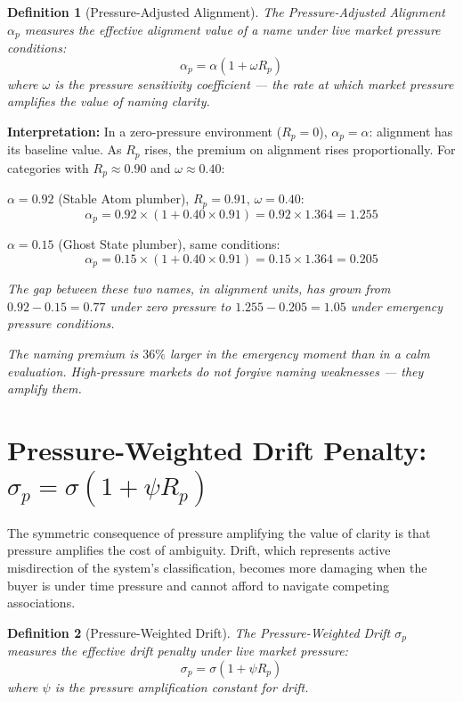 \documentclass[12pt, openany]{book}
\theoremstyle{thmstyle}
\theoremstyle{defstyle}
\newtheorem{definition}{Definition}[chapter]
\begin{document}
\begin{definition}[Pressure-Adjusted Alignment]
The Pressure-Adjusted Alignment $\alpha_p$ measures the effective alignment value of a name under live market pressure conditions:
\begin{equation}
\alpha_p = \alpha(1 + \omega R_p)
\label{eq:pressure_alignment}
\end{equation}
where $\omega$ is the pressure sensitivity coefficient --- the rate at which market pressure amplifies the value of naming clarity.
\end{definition}

\textbf{Interpretation:} In a zero-pressure environment ($R_p = 0$), $\alpha_p = \alpha$: alignment has its baseline value. As $R_p$ rises, the premium on alignment rises proportionally. For categories with $R_p \approx 0.90$ and $\omega \approx 0.40$:

\begin{calcbox}
$\alpha = 0.92$ (Stable Atom plumber), $R_p = 0.91$, $\omega = 0.40$:
\[
\alpha_p = 0.92 \times (1 + 0.40 \times 0.91) = 0.92 \times 1.364 = \mathbf{1.255}
\]

$\alpha = 0.15$ (Ghost State plumber), same conditions:
\[
\alpha_p = 0.15 \times (1 + 0.40 \times 0.91) = 0.15 \times 1.364 = \mathbf{0.205}
\]

\textit{The gap between these two names, in alignment units, has grown from $0.92 - 0.15 = 0.77$ under zero pressure to $1.255 - 0.205 = 1.05$ under emergency pressure conditions.}

\textit{The naming premium is $36\%$ larger in the emergency moment than in a calm evaluation. High-pressure markets do not forgive naming weaknesses --- they amplify them.}
\end{calcbox}

\section{Pressure-Weighted Drift Penalty: $\sigma_p = \sigma(1 + \psi R_p)$}

The symmetric consequence of pressure amplifying the value of clarity is that pressure amplifies the cost of ambiguity. Drift, which represents active misdirection of the system's classification, becomes more damaging when the buyer is under time pressure and cannot afford to navigate competing associations.

\begin{definition}[Pressure-Weighted Drift]
The Pressure-Weighted Drift $\sigma_p$ measures the effective drift penalty under live market pressure:
\begin{equation}
\sigma_p = \sigma(1 + \psi R_p)
\label{eq:pressure_drift}
\end{equation}
where $\psi$ is the pressure amplification constant for drift.
\end{definition}
\end{document}
